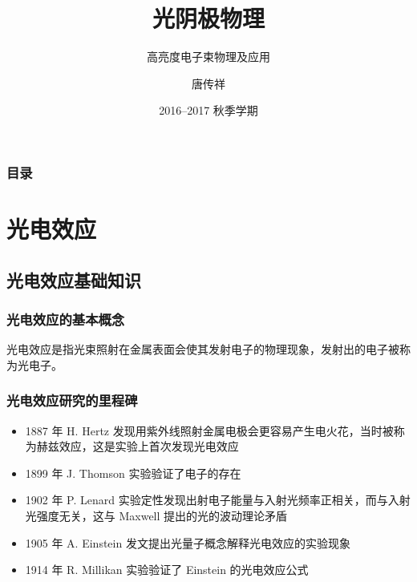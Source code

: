 \documentclass[a4paper]{article}
\title{光阴极物理}
\subtitle{高亮度电子束物理及应用}
\author{唐传祥}
\institute{清华大学工程物理系}
\date{2016--2017 秋季学期}
\begin{document}
\begin{frame}
  \titlepage
\end{frame}

\begin{frame}
  \frametitle{目录}
  \begin{multicols}{2}
  \tableofcontents
  \end{multicols}
\end{frame}

\section{光电效应}

\subsection{光电效应基础知识}

\begin{frame}[label=current]
  \frametitle{光电效应的基本概念}
  \begin{concept}
  	\alert{光电效应}是指光束照射在金属表面会使其发射电子的物理现象，发射出的电子被称为\alert{光电子}。
	\end{concept}
	
	
\end{frame}

\begin{frame}
  \frametitle{光电效应研究的里程碑}
  \begin{itemize}
	  \item 1887 年 H. Hertz 发现用紫外线照射金属电极会更容易产生电火花，当时被称为赫兹效应，这是实验上首次发现光电效应
	  \item 1899 年 J. Thomson 实验验证了电子的存在
	  \item 1902 年 P. Lenard 实验定性发现出射电子能量与入射光频率正相关，而与入射光强度无关，这与 Maxwell 提出的光的波动理论矛盾
		\item 1905 年 A. Einstein 发文提出光量子概念解释光电效应的实验现象
		\item 1914 年 R. Millikan 实验验证了 Einstein 的光电效应公式
  \end{itemize}
\end{frame}
\end{document}
